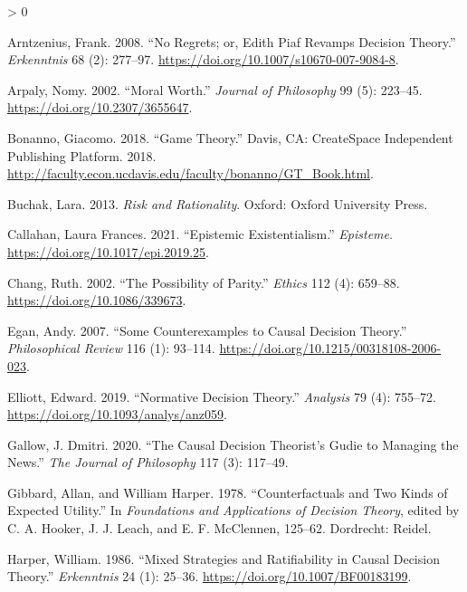 \documentclass[
  12pt,
]{article}
\newlength{\cslhangindent}
\newenvironment{CSLReferences}[2] %
 {%
  \setlength{\parindent}{0pt}
  \ifodd #1 \everypar{\setlength{\hangindent}{\cslhangindent}}\ignorespaces\fi
  \ifnum #2 > 0
  \setlength{\parskip}{#2\baselineskip}
  \fi
 }%
 {}
\begin{document}
\hypertarget{refs}{}
\begin{CSLReferences}{1}{0}
\leavevmode\hypertarget{ref-Arntzenius2008}{}%
Arntzenius, Frank. 2008. {``No Regrets; or, Edith Piaf Revamps Decision
Theory.''} \emph{Erkenntnis} 68 (2): 277--97.
\url{https://doi.org/10.1007/s10670-007-9084-8}.

\leavevmode\hypertarget{ref-Arpaly2002}{}%
Arpaly, Nomy. 2002. {``Moral Worth.''} \emph{Journal of Philosophy} 99
(5): 223--45. \url{https://doi.org/10.2307/3655647}.

\leavevmode\hypertarget{ref-Bonanno2018}{}%
Bonanno, Giacomo. 2018. {``Game Theory.''} Davis, CA: CreateSpace
Independent Publishing Platform. 2018.
\url{http://faculty.econ.ucdavis.edu/faculty/bonanno/GT_Book.html}.

\leavevmode\hypertarget{ref-BuchakRisk}{}%
Buchak, Lara. 2013. \emph{Risk and Rationality}. Oxford: Oxford
University Press.

\leavevmode\hypertarget{ref-Callahan2021}{}%
Callahan, Laura Frances. 2021. {``Epistemic Existentialism.''}
\emph{Episteme}. \url{https://doi.org/10.1017/epi.2019.25}.

\leavevmode\hypertarget{ref-Chang2002}{}%
Chang, Ruth. 2002. {``The Possibility of Parity.''} \emph{Ethics} 112
(4): 659--88. \url{https://doi.org/10.1086/339673}.

\leavevmode\hypertarget{ref-Egan2007-EGASCT}{}%
Egan, Andy. 2007. {``{Some Counterexamples to Causal Decision
Theory}.''} \emph{Philosophical Review} 116 (1): 93--114.
\url{https://doi.org/10.1215/00318108-2006-023}.

\leavevmode\hypertarget{ref-Elliot2019}{}%
Elliott, Edward. 2019. {``Normative Decision Theory.''} \emph{Analysis}
79 (4): 755--72. \url{https://doi.org/10.1093/analys/anz059}.

\leavevmode\hypertarget{ref-Gallow2020}{}%
Gallow, J. Dmitri. 2020. {``The Causal Decision Theorist's Gudie to
Managing the News.''} \emph{The Journal of Philosophy} 117 (3): 117--49.

\leavevmode\hypertarget{ref-GibbardHarper1978}{}%
Gibbard, Allan, and William Harper. 1978. {``Counterfactuals and Two
Kinds of Expected Utility.''} In \emph{Foundations and Applications of
Decision Theory}, edited by C. A. Hooker, J. J. Leach, and E. F.
McClennen, 125--62. Dordrecht: Reidel.

\leavevmode\hypertarget{ref-Harper1986}{}%
Harper, William. 1986. {``Mixed Strategies and Ratifiability in Causal
Decision Theory.''} \emph{Erkenntnis} 24 (1): 25--36.
\url{https://doi.org/10.1007/BF00183199}.


\end{CSLReferences}
\end{document}
